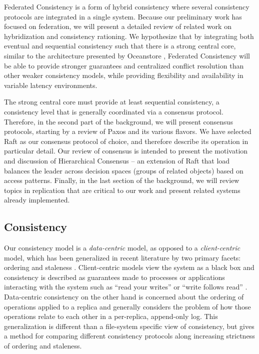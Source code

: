 \documentclass{article}
\begin{document}
Federated Consistency is a form of hybrid consistency where several consistency protocols are integrated in a single system. Because our preliminary work has focused on federation, we will present a detailed review of related work on hybridization and consistency rationing. We hypothesize that by integrating both eventual and sequential consistency such that there is a strong central core, similar to the architecture presented by Oceanstore \cite{kubiatowicz_oceanstore:_2000}, Federated Consistency will be able to provide stronger guarantees and centralized conflict resolution than other weaker consistency models, while providing flexibility and availability in variable latency environments.

The strong central core must provide at least sequential consistency, a consistency level that is generally coordinated via a consensus protocol. Therefore, in the second part of the background, we will present consensus protocols, starting by a review of Paxos \cite{lamport_paxos_2001} and its various flavors. We have selected Raft \cite{ongaro_search_2014} as our consensus protocol of choice, and therefore describe its operation in particular detail. Our review of consensus is intended to present the motivation and discussion of Hierarchical Consensus -- an extension of Raft that load balances the leader across decision spaces (groups of related objects) based on access patterns. Finally, in the last section of the background, we will review topics in replication that are critical to our work and present related systems already implemented.

\subsection{Consistency}

Our consistency model is a \textit{data-centric} model, as opposed to a \textit{client-centric} model, which has been generalized in recent literature by two primary facets: ordering and staleness \cite{bermbach_consistency_2013}. Client-centric models view the system as a black box and consistency is described as guarantees made to processes or applications interacting with the system such as ``read your writes'' or ``write follows read'' \cite{vogels_eventually_2009}. Data-centric consistency on the other hand is concerned about the ordering of operations applied to a replica and generally considers the problem of how those operations relate to each other in a per-replica, append-only log. This generalization is different than a file-system specific view of consistency, but gives a method for comparing different consistency protocols along increasing strictness of ordering and staleness.
\end{document}
